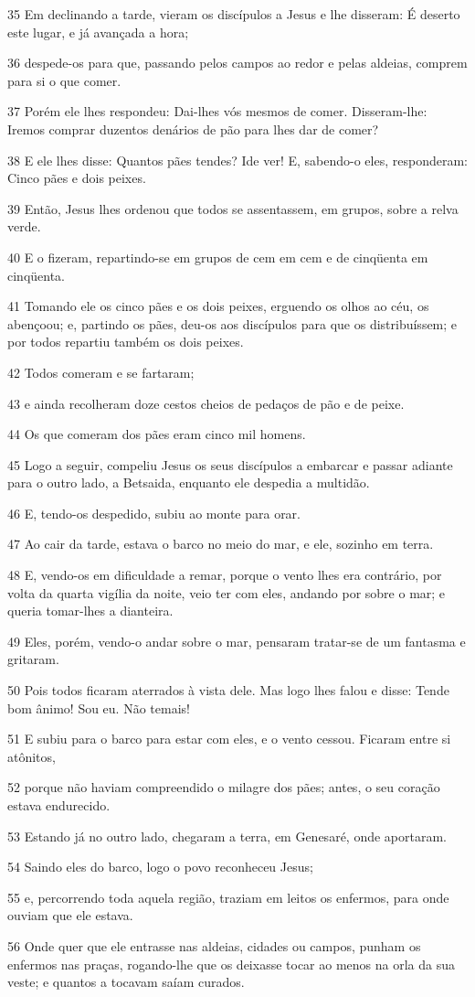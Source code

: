 \par 35 Em declinando a tarde, vieram os discípulos a Jesus e lhe disseram: É deserto este lugar, e já avançada a hora;
\par 36 despede-os para que, passando pelos campos ao redor e pelas aldeias, comprem para si o que comer.
\par 37 Porém ele lhes respondeu: Dai-lhes vós mesmos de comer. Disseram-lhe: Iremos comprar duzentos denários de pão para lhes dar de comer?
\par 38 E ele lhes disse: Quantos pães tendes? Ide ver! E, sabendo-o eles, responderam: Cinco pães e dois peixes.
\par 39 Então, Jesus lhes ordenou que todos se assentassem, em grupos, sobre a relva verde.
\par 40 E o fizeram, repartindo-se em grupos de cem em cem e de cinqüenta em cinqüenta.
\par 41 Tomando ele os cinco pães e os dois peixes, erguendo os olhos ao céu, os abençoou; e, partindo os pães, deu-os aos discípulos para que os distribuíssem; e por todos repartiu também os dois peixes.
\par 42 Todos comeram e se fartaram;
\par 43 e ainda recolheram doze cestos cheios de pedaços de pão e de peixe.
\par 44 Os que comeram dos pães eram cinco mil homens.
\par 45 Logo a seguir, compeliu Jesus os seus discípulos a embarcar e passar adiante para o outro lado, a Betsaida, enquanto ele despedia a multidão.
\par 46 E, tendo-os despedido, subiu ao monte para orar.
\par 47 Ao cair da tarde, estava o barco no meio do mar, e ele, sozinho em terra.
\par 48 E, vendo-os em dificuldade a remar, porque o vento lhes era contrário, por volta da quarta vigília da noite, veio ter com eles, andando por sobre o mar; e queria tomar-lhes a dianteira.
\par 49 Eles, porém, vendo-o andar sobre o mar, pensaram tratar-se de um fantasma e gritaram.
\par 50 Pois todos ficaram aterrados à vista dele. Mas logo lhes falou e disse: Tende bom ânimo! Sou eu. Não temais!
\par 51 E subiu para o barco para estar com eles, e o vento cessou. Ficaram entre si atônitos,
\par 52 porque não haviam compreendido o milagre dos pães; antes, o seu coração estava endurecido.
\par 53 Estando já no outro lado, chegaram a terra, em Genesaré, onde aportaram.
\par 54 Saindo eles do barco, logo o povo reconheceu Jesus;
\par 55 e, percorrendo toda aquela região, traziam em leitos os enfermos, para onde ouviam que ele estava.
\par 56 Onde quer que ele entrasse nas aldeias, cidades ou campos, punham os enfermos nas praças, rogando-lhe que os deixasse tocar ao menos na orla da sua veste; e quantos a tocavam saíam curados.

